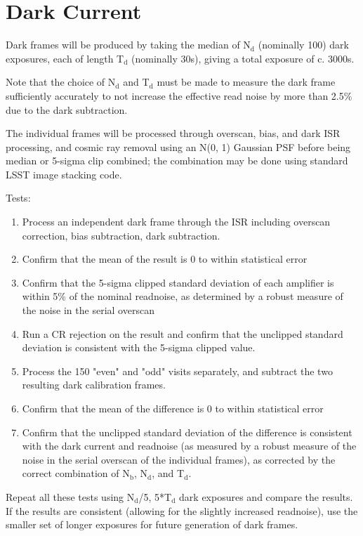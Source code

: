 \documentclass[DM,authoryear,toc,lsstdraft]{lsstdoc}
\begin{document}
\section{Dark Current}

Dark frames will be produced by taking the median of N$_{\text{d}}$ (nominally 100) dark exposures, each of length T$_{\text{d}}$
(nominally 30s), giving a total exposure of c. 3000s.

Note that the choice of N$_{\text{d}}$ and T$_{\text{d}}$ must be made to measure the dark frame sufficiently accurately to not
increase the effective read noise by more than 2.5\% due to the dark subtraction.

The individual frames will be processed through overscan, bias, and dark ISR processing, and cosmic ray
removal using an N(0, 1) Gaussian PSF before being median or 5-sigma clip combined; the combination may be
done using standard LSST image stacking code.

Tests:
\begin{enumerate}
\item Process an independent dark frame through the ISR including overscan correction, bias subtraction,
dark subtraction.
\item Confirm that the mean of the result is 0 to within statistical error
\item Confirm that the 5-sigma clipped standard deviation of each amplifier is within 5\% of
the nominal readnoise, as determined by a robust measure of the noise in the serial overscan
\item Run a CR rejection on the result and confirm that the unclipped standard deviation is
consistent with the 5-sigma clipped value.
\item Process the 150 "even" and "odd" visits separately, and subtract the two resulting dark
calibration frames.
\item Confirm that the mean of the difference is 0 to within statistical error
\item Confirm that the unclipped standard deviation of the difference is consistent with the dark current
and readnoise (as measured by a robust measure of the noise in the serial overscan of the
individual frames), as corrected by the correct combination of N$_{\text{b}}$, N$_{\text{d}}$, and T$_{\text{d}}$.
\end{enumerate}

Repeat all these tests using N$_{\text{d}}$/5, 5*T$_{\text{d}}$ dark exposures and compare the results.  If the results are
consistent (allowing for the slightly increased readnoise), use the smaller set of longer exposures for future
generation of dark frames.
\end{document}

